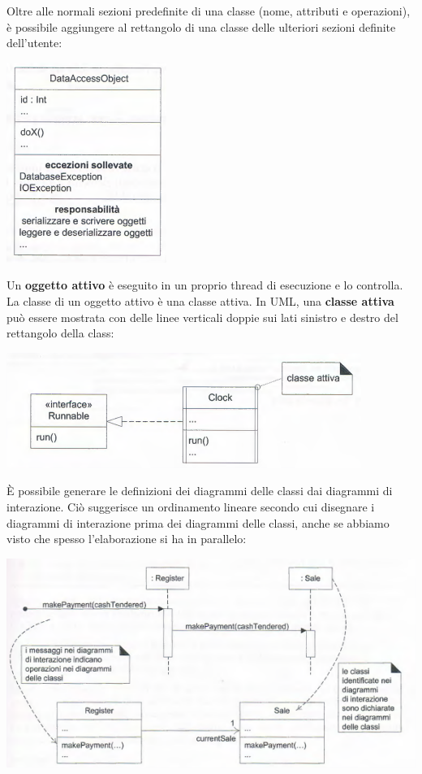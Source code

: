 \documentclass[a4paper,12pt, oneside]{book}
\begin{document}
Oltre alle normali sezioni predefinite di una classe (nome, attributi e operazioni), è possibile aggiungere al rettangolo di una classe delle ulteriori sezioni definite dell'utente:
\begin{center}
	\includegraphics[scale=0.7]{img/clasd21.png}
\end{center}
\newpage
Un \textbf{oggetto attivo} è eseguito in un proprio thread di esecuzione e lo controlla. La classe di un oggetto attivo è una classe attiva. In UML, una \textbf{classe attiva} può essere mostrata con delle linee verticali doppie sui lati sinistro e destro del rettangolo della class:
\begin{center}
	\includegraphics[scale=0.7]{img/clasd23.png}
\end{center}
È possibile generare le definizioni dei diagrammi delle classi dai diagrammi di interazione. Ciò suggerisce un ordinamento lineare secondo cui disegnare i diagrammi di interazione prima dei diagrammi delle classi, anche se abbiamo visto che spesso l'elaborazione si ha in parallelo:
\begin{center}
	\includegraphics[scale=0.7]{img/clasd24.png}
\end{center}
\end{document}
